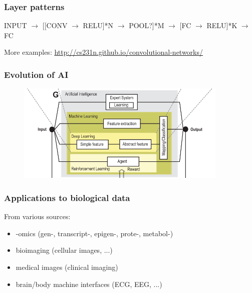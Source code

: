 \begin{frame}
	\frametitle{Layer patterns}

	INPUT $\rightarrow$ [[CONV $\rightarrow$ RELU]*N $\rightarrow$ POOL?]*M $\rightarrow$ [FC $\rightarrow$ 
	RELU]*K $\rightarrow$ FC

	\vskip 1cm

	More examples: \url{http://cs231n.github.io/convolutional-networks/}

\end{frame}

\begin{frame}
	\frametitle{Evolution of AI}

	\begin{figure}
		\includegraphics[width=0.9\textwidth]{Pics/evoAI.png}
	\end{figure}

\end{frame}

\begin{frame}
	\frametitle{Applications to biological data}

	From various sources:
	\begin{itemize}
		\item -omics (gen-, transcript-, epigen-, prote-, metabol-)
		\item bioimaging (cellular images, ...)
		\item medical images (clinical imaging)
		\item brain/body machine interfaces (ECG, EEG, ...)
	\end{itemize}

\end{frame}

